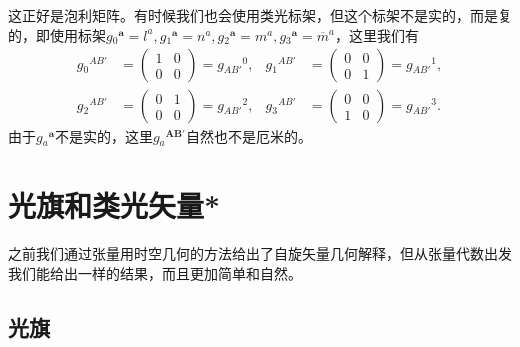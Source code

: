 这正好是泡利矩阵。有时候我们也会使用类光标架，但这个标架不是实的，而是复的，即使用标架$g{_{0}}^{\boldsymbol{a}} =l^{a} ,g{_{1}}^{\boldsymbol{a}} =n^{a} ,g{_{2}}^{\boldsymbol{a}} =m^{a} ,g{_{3}}^{\boldsymbol{a}} =\overline{m}^{a}$，这里我们有
\begin{equation*}
	\begin{aligned}
		g{_{0}}^{AB'} & =\begin{pmatrix}
			1 & 0\\
			0 & 0
		\end{pmatrix} =g{_{AB'}}^{0} , & g{_{1}}^{AB'} & =\begin{pmatrix}
			0 & 0\\
			0 & 1
		\end{pmatrix} =g{_{AB'}}^{1} ,\\
		g{_{2}}^{AB'} & =\begin{pmatrix}
			0 & 1\\
			0 & 0
		\end{pmatrix} =g{_{AB'}}^{2} , & g{_{3}}^{AB'} & =\begin{pmatrix}
			0 & 0\\
			1 & 0
		\end{pmatrix} =g{_{AB'}}^{3} .
	\end{aligned}
\end{equation*}
由于$g{_{a}}^{\boldsymbol{a}}$不是实的，这里$g{_{a}}^{\boldsymbol{AB} '}$自然也不是厄米的。


\section{光旗和类光矢量*}

之前我们通过张量用时空几何的方法给出了自旋矢量几何解释，但从张量代数出发我们能给出一样的结果，而且更加简单和自然。


\subsection{光旗}

